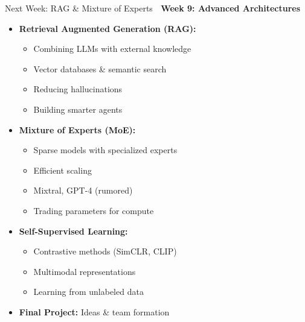 \documentclass[aspectratio=169]{beamer}
\begin{document}
\begin{frame}{Next Week: RAG \& Mixture of Experts 🔮}
\textbf{Week 9: Advanced Architectures}

\vspace{1em}

\begin{itemize}
    \item \textbf{Retrieval Augmented Generation (RAG):}
    \begin{itemize}
        \item Combining LLMs with external knowledge
        \item Vector databases \& semantic search
        \item Reducing hallucinations
        \item Building smarter agents
    \end{itemize}

    \item \textbf{Mixture of Experts (MoE):}
    \begin{itemize}
        \item Sparse models with specialized experts
        \item Efficient scaling
        \item Mixtral, GPT-4 (rumored)
        \item Trading parameters for compute
    \end{itemize}

    \item \textbf{Self-Supervised Learning:}
    \begin{itemize}
        \item Contrastive methods (SimCLR, CLIP)
        \item Multimodal representations
        \item Learning from unlabeled data
    \end{itemize}

    \item \textbf{Final Project:} Ideas \& team formation
\end{itemize}
\end{frame}
\end{document}
